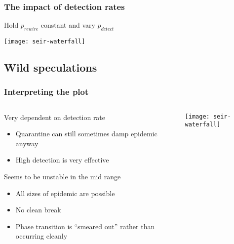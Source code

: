 \documentclass{beamer}
\begin{document}
\begin{frame}
  \frametitle{The impact of detection rates}

  \begin{block}{Hold $p_{rewire}$ constant and vary $p_{detect}$}
  \end{block}

  \centering
  \texttt{[image: seir-waterfall]}  
\end{frame}


\subsection{Wild speculations}

\begin{frame}
  \frametitle{Interpreting the plot}

  \begin{columns}
    \begin{column}[c]{.6\textwidth}
      \begin{block}{Very dependent on detection rate}
        \begin{itemize}
        \item Quarantine can still sometimes damp epidemic anyway
        \item High detection is very effective
        \end{itemize}
      \end{block}
      
      \begin{block}{Seems to be unstable in the mid range}
        \begin{itemize}
        \item All sizes of epidemic are possible
        \item No clean break
        \item Phase transition is ``smeared out'' rather than
          occurring cleanly
        \end{itemize}
      \end{block}
    \end{column}
    \begin{column}[c]{.4\textwidth}
       \texttt{[image: seir-waterfall]}
    \end{column}
  \end{columns}
\end{frame}
\end{document}
